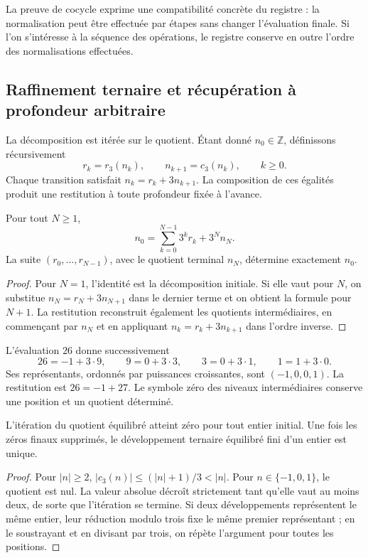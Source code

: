 La preuve de cocycle exprime une compatibilité concrète du registre :
la normalisation peut être effectuée par étapes sans changer l'évaluation
finale. Si l'on s'intéresse à la séquence des opérations, le registre conserve
en outre l'ordre des normalisations effectuées.

\subsection{Raffinement ternaire et récupération à profondeur arbitraire}
\label{trit:refinamiento}

La décomposition est itérée sur le quotient. Étant donné \(n_0\in\mathbb Z\),
définissons récursivement
\[
 r_k=r_3(n_k),\qquad n_{k+1}=c_3(n_k),\qquad k\ge0.
\]
Chaque transition satisfait \(n_k=r_k+3n_{k+1}\). La composition de ces
égalités produit une restitution à toute profondeur fixée à l'avance.

\begin{proposicion}
\label{trit:prop:profundidad}
Pour tout \(N\ge1\),
\begin{equation}
 n_0=\sum_{k=0}^{N-1}3^kr_k+3^Nn_N.
\label{trit:eq:restitucionN}
\end{equation}
La suite \((r_0,\ldots,r_{N-1})\), avec le quotient terminal
\(n_N\), détermine exactement \(n_0\).
\end{proposicion}
\begin{proof}
Pour \(N=1\), l'identité est la décomposition initiale. Si elle vaut pour
\(N\), on substitue \(n_N=r_N+3n_{N+1}\) dans le dernier terme et on
obtient la formule pour \(N+1\). La restitution reconstruit également les
quotients intermédiaires, en commençant par \(n_N\) et en appliquant
\(n_k=r_k+3n_{k+1}\) dans l'ordre inverse.
\end{proof}

\begin{ejemplo}
L'évaluation \(26\) donne successivement
\[
 26=-1+3\cdot9,\qquad 9=0+3\cdot3,
 \qquad 3=0+3\cdot1,\qquad1=1+3\cdot0.
\]
Ses représentants, ordonnés par puissances croissantes, sont
\((-1,0,0,1)\). La restitution est \(26=-1+27\). Le symbole zéro des
niveaux intermédiaires conserve une position et un quotient déterminé.
\end{ejemplo}

\begin{proposicion}
L'itération du quotient équilibré atteint zéro pour tout entier
initial. Une fois les zéros finaux supprimés, le développement ternaire
équilibré fini d'un entier est unique.
\end{proposicion}
\begin{proof}
Pour \(|n|\ge2\),
\( |c_3(n)|\le(|n|+1)/3<|n|\).
Pour \(n\in\{-1,0,1\}\), le quotient est nul. La valeur absolue
décroît strictement tant qu'elle vaut au moins deux, de sorte que
l'itération se termine. Si deux développements représentent le même entier,
leur réduction modulo trois fixe le même premier représentant ; en le soustrayant
et en divisant par trois, on répète l'argument pour toutes les positions.
\end{proof}

